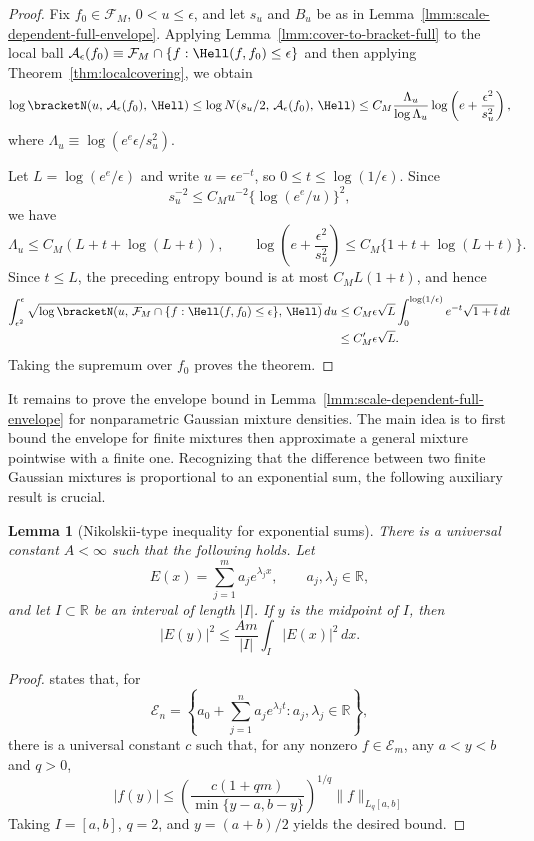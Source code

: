 \documentclass[letterpaper,11pt]{article}
\newcommand{\calF}{{\mathcal{F}}}
\newtheorem{lemma}[theorem]{Lemma}
\theoremstyle{definition}
\begin{document}
\begin{proof}
Fix $f_0\in\calF_M$, $0<u\le\epsilon$, and let $s_u$ and $B_u$ be as
in Lemma~\ref{lmm:scale-dependent-full-envelope}.  Applying
Lemma~\ref{lmm:cover-to-bracket-full} to the local ball
$
\mathcal A_\epsilon(f_0)
\equiv 
\calF_M\cap\{f:\Hell(f,f_0)\le\epsilon\}$ 
and then applying Theorem~\ref{thm:localcovering}, we obtain
\[
\log
\bracketN\!\left(
u,\,
\mathcal A_\epsilon(f_0),\,
\Hell
\right)
\le
\log
N\!\left(
s_u/2,\,
\mathcal A_\epsilon(f_0),\,
\Hell
\right)
\le
C_M
\frac{\Lambda_u}{\log\Lambda_u}
\log\left(e+\frac{\epsilon^2}{s_u^2}\right),
\]
where $\Lambda_u\equiv\log\left(e^e\epsilon/s_u^2\right)$.

Let $L=\log(e^e/\epsilon)$ and write $u=\epsilon e^{-t}$, so
$0\le t\le \log(1/\epsilon)$.  Since
\[
s_u^{-2}\le C_Mu^{-2}\{\log(e^e/u)\}^2,
\]
we have
\[
\Lambda_u\leq C_M (L+t+\log(L+t)),
\qquad
\log\left(e+\frac{\epsilon^2}{s_u^2}\right)
\le C_M\{1+t+\log(L+t)\}.
\]
Since $t \leq L$, the preceding entropy bound is at most $C_M L(1+t)$, and hence
\[
\begin{aligned}
\int_{\epsilon^2}^{\epsilon}
\sqrt{
\log
\bracketN\!\left(
u,\,
\calF_M\cap\{f:\Hell(f,f_0)\le\epsilon\},\,
\Hell
\right)
}\,du
&\le
C_M\epsilon \sqrt{L} \int_0^{\log(1/\epsilon)}
e^{-t}\sqrt{1+t}\,dt \\
&\le
C_M'\epsilon\sqrt L .
\end{aligned}
\]
Taking the supremum over $f_0$ proves the theorem.
\end{proof}

It remains to prove the envelope bound in Lemma~\ref{lmm:scale-dependent-full-envelope} for nonparametric Gaussian mixture densities. 
The main idea is to first bound the envelope for finite mixtures then approximate a general mixture pointwise with a finite one. 
Recognizing that the difference between two finite Gaussian mixtures is proportional to an exponential sum, the following auxiliary result is crucial.


\begin{lemma}[Nikolskii-type inequality for exponential sums]
\label{lmm:nikolskii-exponential-sums}
There is a universal constant $A<\infty$ such that the following holds.  Let
\[
E(x)=\sum_{j=1}^m a_j e^{\lambda_j x},
\qquad a_j,\lambda_j\in\mathbb R,
\]
and let $I\subset\mathbb R$ be an interval of length $|I|$.  If $y$ is
the midpoint of $I$, then
\[
|E(y)|^2\le \frac{A m}{|I|}\int_I |E(x)|^2\,dx .
\]
\end{lemma}

\begin{proof}
\cite[Theorem~2.2]{borwein2000pointwise} states that, for
\[
\mathcal E_n
=
\left\{a_0+\sum_{j=1}^n a_j e^{\lambda_j t}:
a_j,\lambda_j\in\mathbb R\right\},
\]
there is a universal constant $c$ such that, 
for any nonzero $f\in\mathcal E_m$, any $a<y<b$ and $q>0$,
\[
|f(y)|
\le
\left(
\frac{c(1+qm)}{\min\{y-a,b-y\}}
\right)^{1/q} \|f\|_{L_q[a,b]}
\]
Taking $I=[a,b]$, $q=2$, and $y=(a+b)/2$ yields the desired bound.
\end{proof}
\end{document}

